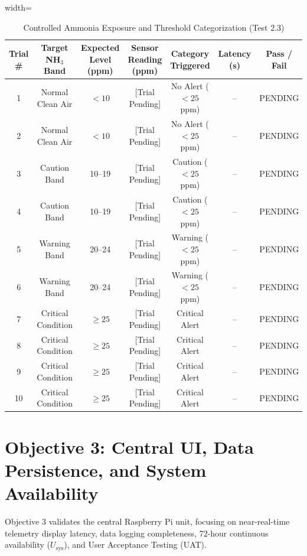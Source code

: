 \begin{table}[htbp!]
\centering
\caption{Controlled Ammonia Exposure and Threshold Categorization (Test 2.3)}
\label{tab:mq135_exposure}
\begin{adjustbox}{width=\textwidth}
\begin{tabular}{ccccccc}
\toprule
\textbf{Trial \#} & \textbf{Target NH$_3$ Band} & \textbf{Expected Level (ppm)} & \textbf{Sensor Reading (ppm)} & \textbf{Category Triggered} & \textbf{Latency (s)} & \textbf{Pass / Fail} \\
\midrule
1 & Normal Clean Air & $<10$ & [Trial Pending] & No Alert ($<25$\,ppm) & -- & PENDING \\
2 & Normal Clean Air & $<10$ & [Trial Pending] & No Alert ($<25$\,ppm) & -- & PENDING \\
3 & Caution Band & 10--19 & [Trial Pending] & Caution ($<25$\,ppm) & -- & PENDING \\
4 & Caution Band & 10--19 & [Trial Pending] & Caution ($<25$\,ppm) & -- & PENDING \\
5 & Warning Band & 20--24 & [Trial Pending] & Warning ($<25$\,ppm) & -- & PENDING \\
6 & Warning Band & 20--24 & [Trial Pending] & Warning ($<25$\,ppm) & -- & PENDING \\
7 & Critical Condition & $\ge 25$ & [Trial Pending] & Critical Alert & -- & PENDING \\
8 & Critical Condition & $\ge 25$ & [Trial Pending] & Critical Alert & -- & PENDING \\
9 & Critical Condition & $\ge 25$ & [Trial Pending] & Critical Alert & -- & PENDING \\
10 & Critical Condition & $\ge 25$ & [Trial Pending] & Critical Alert & -- & PENDING \\
\bottomrule
\end{tabular}
\end{adjustbox}
\end{table}

\section{Objective 3: Central UI, Data Persistence, and System Availability}
\label{sec:results_obj3}

Objective 3 validates the central Raspberry Pi unit, focusing on near-real-time telemetry display latency, data logging completeness, 72-hour continuous availability ($U_{\text{sys}}$), and User Acceptance Testing (UAT).

